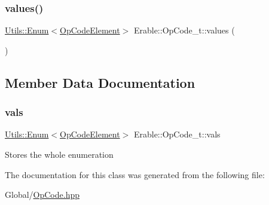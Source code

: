 \mbox{\label{class_erable_1_1_op_code__t_a3af521f1bf56353a26915479aa122cd5}} 
\subsubsection{\texorpdfstring{values()}{values()}}
{\footnotesize\ttfamily \mbox{\hyperlink{class_erable_1_1_utils_1_1_enum}{Utils\+::\+Enum}}$<$\mbox{\hyperlink{class_erable_1_1_op_code_element}{Op\+Code\+Element}}$>$ Erable\+::\+Op\+Code\+\_\+t\+::values (\begin{DoxyParamCaption}{ }\end{DoxyParamCaption})\hspace{0.3cm}{\ttfamily [inline]}}



\subsection{Member Data Documentation}
\mbox{\label{class_erable_1_1_op_code__t_ae2fe5eac3128b065de47103785ba8ea1}} 
\subsubsection{\texorpdfstring{vals}{vals}}
{\footnotesize\ttfamily \mbox{\hyperlink{class_erable_1_1_utils_1_1_enum}{Utils\+::\+Enum}}$<$\mbox{\hyperlink{class_erable_1_1_op_code_element}{Op\+Code\+Element}}$>$ Erable\+::\+Op\+Code\+\_\+t\+::vals}

Stores the whole enumeration 

The documentation for this class was generated from the following file\+:\begin{DoxyCompactItemize}
\item 
Global/\mbox{\hyperlink{_op_code_8hpp}{Op\+Code.\+hpp}}\end{DoxyCompactItemize}

